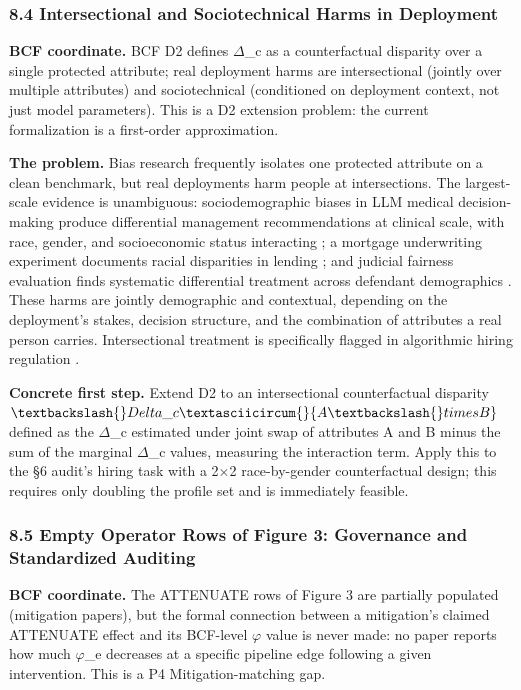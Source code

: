 \documentclass[10pt]{article}
\begin{document}
\subsubsection*{8.4 Intersectional and Sociotechnical Harms in Deployment}

\textbf{BCF coordinate.} BCF D2 defines $\Delta$\_c as a counterfactual disparity over a single protected attribute; real deployment harms are intersectional (jointly over multiple attributes) and sociotechnical (conditioned on deployment context, not just model parameters). This is a D2 extension problem: the current formalization is a first-order approximation.

\textbf{The problem.} Bias research frequently isolates one protected attribute on a clean benchmark, but real deployments harm people at intersections. The largest-scale evidence is unambiguous: sociodemographic biases in LLM medical decision-making produce differential management recommendations at clinical scale, with race, gender, and socioeconomic status interacting \cite{omar2025sociodemographic}; a mortgage underwriting experiment documents racial disparities in lending \cite{bowen2024measuring}; and judicial fairness evaluation finds systematic differential treatment across defendant demographics \cite{hu2025llms}. These harms are jointly demographic and contextual, depending on the deployment's stakes, decision structure, and the combination of attributes a real person carries. Intersectional treatment is specifically flagged in algorithmic hiring regulation \cite{raghavan2020mitigating}.

\textbf{Concrete first step.} Extend D2 to an intersectional counterfactual disparity $\textbackslash\{\}Delta\_c\textasciicircum\{\}\{A \textbackslash\{\}times B\}$ defined as the $\Delta$\_c estimated under joint swap of attributes A and B minus the sum of the marginal $\Delta$\_c values, measuring the interaction term. Apply this to the \S{}6 audit's hiring task with a 2$\times$2 race-by-gender counterfactual design; this requires only doubling the profile set and is immediately feasible.

\subsubsection*{8.5 Empty Operator Rows of Figure 3: Governance and Standardized Auditing}

\textbf{BCF coordinate.} The ATTENUATE rows of Figure 3 are partially populated (mitigation papers), but the formal connection between a mitigation's claimed ATTENUATE effect and its BCF-level $\varphi$ value is never made: no paper reports how much $\varphi$\_e decreases at a specific pipeline edge following a given intervention. This is a P4 Mitigation-matching gap.
\end{document}
